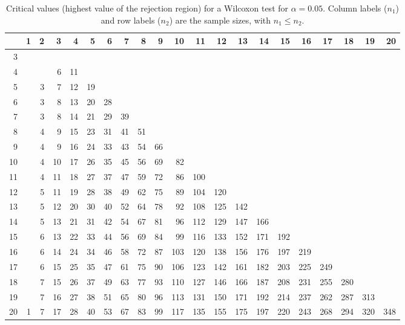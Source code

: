 \begin{table}[ht]
\centering
\begin{tabular}{rrrrrrrrrrrrrrrrrrrrr}
  \hline
 & 1 & 2 & 3 & 4 & 5 & 6 & 7 & 8 & 9 & 10 & 11 & 12 & 13 & 14 & 15 & 16 & 17 & 18 & 19 & 20 \\ 
  \hline
3 &  &  &  &  &  &  &  &  &  &  &  &  &  &  &  &  &  &  &  &  \\ 
  4 &  &  & 6 & 11 &  &  &  &  &  &  &  &  &  &  &  &  &  &  &  &  \\ 
  5 &  & 3 & 7 & 12 & 19 &  &  &  &  &  &  &  &  &  &  &  &  &  &  &  \\ 
  6 &  & 3 & 8 & 13 & 20 & 28 &  &  &  &  &  &  &  &  &  &  &  &  &  &  \\ 
  7 &  & 3 & 8 & 14 & 21 & 29 & 39 &  &  &  &  &  &  &  &  &  &  &  &  &  \\ 
  8 &  & 4 & 9 & 15 & 23 & 31 & 41 & 51 &  &  &  &  &  &  &  &  &  &  &  &  \\ 
  9 &  & 4 & 9 & 16 & 24 & 33 & 43 & 54 & 66 &  &  &  &  &  &  &  &  &  &  &  \\ 
  10 &  & 4 & 10 & 17 & 26 & 35 & 45 & 56 & 69 & 82 &  &  &  &  &  &  &  &  &  &  \\ 
  11 &  & 4 & 11 & 18 & 27 & 37 & 47 & 59 & 72 & 86 & 100 &  &  &  &  &  &  &  &  &  \\ 
  12 &  & 5 & 11 & 19 & 28 & 38 & 49 & 62 & 75 & 89 & 104 & 120 &  &  &  &  &  &  &  &  \\ 
  13 &  & 5 & 12 & 20 & 30 & 40 & 52 & 64 & 78 & 92 & 108 & 125 & 142 &  &  &  &  &  &  &  \\ 
  14 &  & 5 & 13 & 21 & 31 & 42 & 54 & 67 & 81 & 96 & 112 & 129 & 147 & 166 &  &  &  &  &  &  \\ 
  15 &  & 6 & 13 & 22 & 33 & 44 & 56 & 69 & 84 & 99 & 116 & 133 & 152 & 171 & 192 &  &  &  &  &  \\ 
  16 &  & 6 & 14 & 24 & 34 & 46 & 58 & 72 & 87 & 103 & 120 & 138 & 156 & 176 & 197 & 219 &  &  &  &  \\ 
  17 &  & 6 & 15 & 25 & 35 & 47 & 61 & 75 & 90 & 106 & 123 & 142 & 161 & 182 & 203 & 225 & 249 &  &  &  \\ 
  18 &  & 7 & 15 & 26 & 37 & 49 & 63 & 77 & 93 & 110 & 127 & 146 & 166 & 187 & 208 & 231 & 255 & 280 &  &  \\ 
  19 &  & 7 & 16 & 27 & 38 & 51 & 65 & 80 & 96 & 113 & 131 & 150 & 171 & 192 & 214 & 237 & 262 & 287 & 313 &  \\ 
  20 & 1 & 7 & 17 & 28 & 40 & 53 & 67 & 83 & 99 & 117 & 135 & 155 & 175 & 197 & 220 & 243 & 268 & 294 & 320 & 348 \\ 
   \hline
\end{tabular}
\caption{Critical values (highest value of the rejection region) for a Wilcoxon test for $\alpha=0.05$. Column labels ($n_1$) and row labels ($n_2$) are the sample sizes, with ${n_1}\leq{n_2}$.} 
\end{table}
